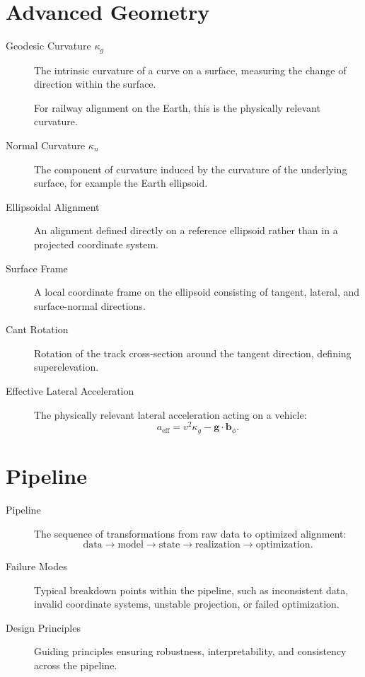 \section*{Advanced Geometry}

\begin{description}

\item[Geodesic Curvature \(\kappa_g\)]
The intrinsic curvature of a curve on a surface, measuring the change of
direction within the surface.

For railway alignment on the Earth, this is the physically relevant
curvature.

\item[Normal Curvature \(\kappa_n\)]
The component of curvature induced by the curvature of the underlying
surface, for example the Earth ellipsoid.

\item[Ellipsoidal Alignment]
An alignment defined directly on a reference ellipsoid rather than in a
projected coordinate system.

\item[Surface Frame]
A local coordinate frame on the ellipsoid consisting of tangent,
lateral, and surface-normal directions.

\item[Cant Rotation]
Rotation of the track cross-section around the tangent direction,
defining superelevation.

\item[Effective Lateral Acceleration]
The physically relevant lateral acceleration acting on a vehicle:
\[
a_{\mathrm{eff}}
=
v^2\kappa_g
-
\mathbf{g}\cdot\mathbf{b}_{\phi}.
\]

\end{description}

\section*{Pipeline}

\begin{description}

\item[Pipeline]
The sequence of transformations from raw data to optimized alignment:
\[
\text{data}
\rightarrow
\text{model}
\rightarrow
\text{state}
\rightarrow
\text{realization}
\rightarrow
\text{optimization}.
\]

\item[Failure Modes]
Typical breakdown points within the pipeline, such as inconsistent data,
invalid coordinate systems, unstable projection, or failed optimization.

\item[Design Principles]
Guiding principles ensuring robustness, interpretability, and consistency
across the pipeline.

\end{description}
